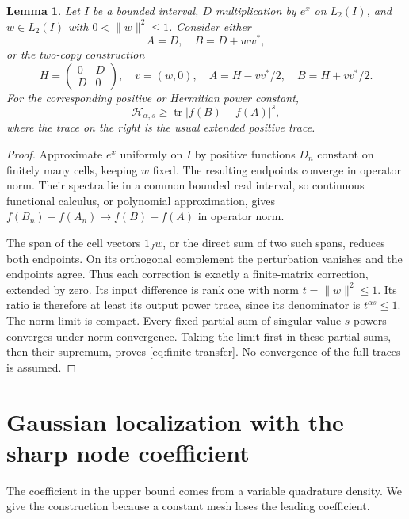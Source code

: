 \documentclass[11pt]{article}
\newtheorem{lemma}[theorem]{Lemma}
\numberwithin{equation}{section}
\newcommand{\tr}{\operatorname{tr}}
\newcommand{\cH}{\mathcal H}
\begin{document}
\begin{lemma}\label{lem:finite-transfer}
Let $I$ be a bounded interval, $D$ multiplication by $e^x$ on $L_2(I)$,
and $w\in L_2(I)$ with $0<\|w\|^2\le1$. Consider either
\[
 A=D,\quad B=D+ww^*,
\]
or the two-copy construction
\[
 H=\begin{pmatrix}0&D\\D&0\end{pmatrix},\quad
 v=(w,0),\quad A=H-vv^*/2,\quad B=H+vv^*/2.
\]
For the corresponding positive or Hermitian power constant,
\begin{equation}\label{eq:finite-transfer}
 \cH_{\alpha,s}\ge\tr|f(B)-f(A)|^s,
\end{equation}
where the trace on the right is the usual extended positive trace.
\end{lemma}
\begin{proof}
Approximate $e^x$ uniformly on $I$ by positive functions $D_n$ constant
on finitely many cells, keeping $w$ fixed. The resulting endpoints
converge in operator norm. Their spectra lie in a common bounded real
interval, so continuous functional calculus, or polynomial approximation,
gives $f(B_n)-f(A_n)\to f(B)-f(A)$ in operator norm.

The span of the cell vectors $1_Jw$, or the direct sum of two such spans,
reduces both endpoints. On its orthogonal complement the perturbation
vanishes and the endpoints agree. Thus each correction is exactly a
finite-matrix correction, extended by zero. Its input difference is
rank one with norm $t=\|w\|^2\le1$. Its ratio is therefore at least its
output power trace, since its denominator is $t^{\alpha s}\le1$.
The norm limit is compact. Every fixed partial sum of singular-value
$s$-powers converges under norm convergence. Taking the limit first in
these partial sums, then their supremum, proves
\eqref{eq:finite-transfer}. No convergence of the full traces is assumed.
\end{proof}

\section{Gaussian localization with the sharp node coefficient}

The coefficient in the upper bound comes from a variable quadrature
density. We give the construction because a constant mesh loses the
leading coefficient.
\end{document}
